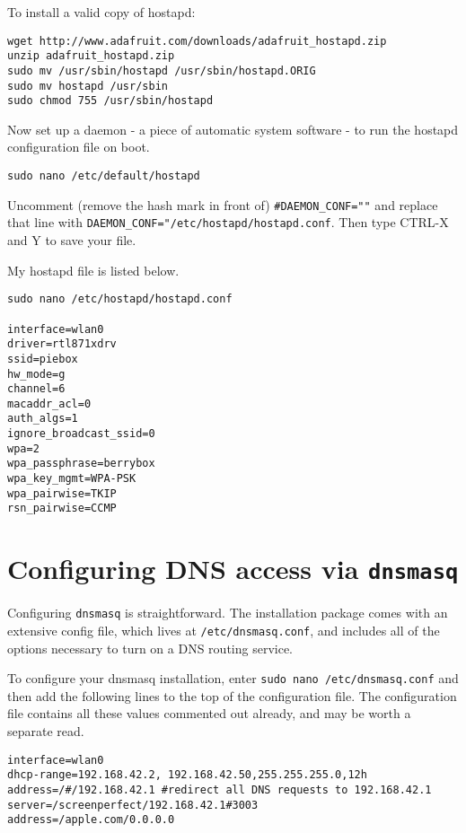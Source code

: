 To install a valid copy of hostapd:
\begin{lstlisting}
wget http://www.adafruit.com/downloads/adafruit_hostapd.zip 
unzip adafruit_hostapd.zip 
sudo mv /usr/sbin/hostapd /usr/sbin/hostapd.ORIG 
sudo mv hostapd /usr/sbin
sudo chmod 755 /usr/sbin/hostapd
\end{lstlisting}
 
Now set up a daemon - a piece of automatic system software - to run the hostapd configuration file on boot.
\begin{lstlisting}
sudo nano /etc/default/hostapd
\end{lstlisting}
Uncomment (remove the hash mark in front of) \texttt{\#DAEMON_CONF=""} and replace that line with \texttt{DAEMON_CONF="/etc/hostapd/hostapd.conf}.
Then type CTRL-X and Y to save your file.

My hostapd file is listed below.

\begin{lstlisting}
sudo nano /etc/hostapd/hostapd.conf

interface=wlan0
driver=rtl871xdrv
ssid=piebox
hw_mode=g
channel=6
macaddr_acl=0
auth_algs=1
ignore_broadcast_ssid=0
wpa=2
wpa_passphrase=berrybox
wpa_key_mgmt=WPA-PSK
wpa_pairwise=TKIP
rsn_pairwise=CCMP

\end{lstlisting}


\section{Configuring DNS access via \texttt{dnsmasq}}

Configuring \texttt{dnsmasq} is straightforward. The installation package comes with an extensive config file, which lives at \texttt{/etc/dnsmasq.conf}, and includes all of the options necessary to turn on a DNS routing service.

To configure your dnsmasq installation, enter \texttt{sudo nano /etc/dnsmasq.conf} and then add the following lines to the top of the configuration file. The configuration file contains all these values commented out already, and may be worth a separate read.

\begin{lstlisting}
interface=wlan0
dhcp-range=192.168.42.2, 192.168.42.50,255.255.255.0,12h
address=/#/192.168.42.1 #redirect all DNS requests to 192.168.42.1
server=/screenperfect/192.168.42.1#3003
address=/apple.com/0.0.0.0
\end{lstlisting}

